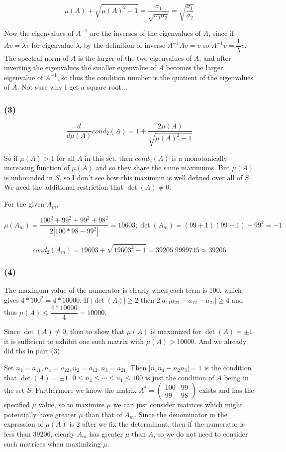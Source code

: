 \documentclass{article}
\begin{document}
\[ \mu(A) + \sqrt{\mu(A)^2 - 1} = \dfrac{\sigma_1}{\sqrt{\sigma_1 \sigma_2}} = \sqrt{\dfrac{\sigma_1}{\sigma_2}} \]

Now the eigenvalues of $A^{-1}$ are the inverses of the eigenvalues of $A$, since if $Av = \lambda v$ for eigenvalue $\lambda$, by the definition of inverse $A^{-1} A v = v$ so $A^{-1} v = \dfrac{1}{\lambda} v$. The spectral norm of $A$ is the larger of the two eigenvalues of $A$, and after inverting the eigenvalues the smaller eigenvalue of $A$ becomes the larger eigenvalue of $A^{-1}$, so thus the condition number is the quotient of the eigenvalues of $A$. Not sure why I get a square root...

\subsubsection{(3)}

\[ \dfrac{d}{d\mu(A)} cond_2(A) = 1 + \dfrac{2 \mu(A)}{\sqrt{\mu(A)^2 - 1}} \]

So if $\mu(A) > 1$ for all $A$ in this set, then $cond_2(A)$ is a monotonically increasing function of $\mu(A)$ and so they share the same maximums. But $\mu(A)$ is unbounded in $S$, so I don't see how this maximum is well defined over all of $S$. We need the additional restriction that $\det(A) \neq 0$. 

For the given $A_m$, 

\[ \mu(A_m) = \dfrac{100^2 + 99^2 + 99^2 + 98^2}{2|100*98 - 99^2|} = 19603; \det(A_m) = (99+1)(99-1) - 99^2 = -1 \]

\[ cond_2(A_m) = 19603 + \sqrt{19603^2 - 1} = 39205.9999745 \approx 39206 \]

\subsubsection{(4)}

The maximum value of the numerator is clearly when each term is 100, which gives $4 * 100^2 = 4 * 10000$. If $|\det(A)| \ge 2$ then $2|a_{11} a_{22} - a_{12} - a_{21}| \ge 4$ and thus $\mu(A) \le \dfrac{4 * 10000}{4} = 10000$. 

Since $\det(A) \neq 0$, then to show that $\mu(A)$ is maximized for $\det(A) = \pm 1$ it is sufficient to exhibit one such matrix with $\mu(A) > 10000$. And we already did ths in part (3). 

Set $n_1 = a_{11}, n_4 = a_{22}, n_2 = a_{12}, n_3 = a_{21}$. Then $|n_1 n_4 - n_2 n_3| = 1$ is the condition that $\det(A) = \pm 1$. $0 \le n_4 \le \cdots \le n_1 \le 100$ is just the condition of $A$ being in the set $S$. Furthermore we know the matrix $A^* = \left(\begin{array}{cc} 100 & 99 \\ 99 & 98 \end{array}\right)$ exists and has the specified $\mu$ value, so to maximize $\mu$ we can just consider matrices which might potentially have greater $\mu$ than that of $A_m$. Since the denominator in the expression of $\mu(A)$ is 2 after we fix the determinant, then if the numerator is less than $39206$, clearly $A_m$ has greater $\mu$ than $A$, so we do not need to consider such matrices when maximizing $\mu$. 
\end{document}
